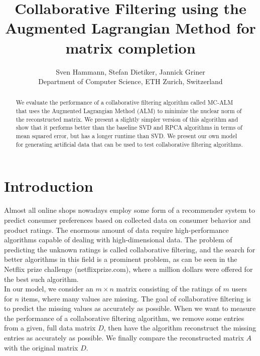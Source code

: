 \documentclass[10pt,conference,compsocconf]{IEEEtran}
\begin{document}
\title{Collaborative Filtering using the Augmented Lagrangian Method for matrix completion}

\author{
  Sven Hammann, Stefan Dietiker, Jannick Griner\\
  Department of Computer Science, ETH Zurich, Switzerland
}



\maketitle

\begin{abstract}
We evaluate the performance of a collaborative filtering algorithm called MC-ALM that uses the
Augmented Lagrangian Method (ALM) to minimize the nuclear norm of the reconstructed matrix.
We present a slightly simpler version of this algorithm and show that it performs better than the baseline
SVD and RPCA algorithms in terms of mean squared error, but has a longer runtime than SVD. We present our own 
model for generating artificial data that can be used to test collaborative filtering algorithms.
\end{abstract}

\section{Introduction}
Almost all online shops nowadays employ some form of a recommender system to predict consumer preferences based on collected data on consumer behavior and product ratings. The enormous amount of data require high-performance algorithms capable of dealing with high-dimensional data. The problem of predicting the unknown ratings is called collaborative filtering, and the search for better algorithms in this field is a prominent problem, as can be seen in the Netflix prize challenge (netflixprize.com), where a million dollars were offered for the best such algorithm. \\

In our model, we consider an $m \times n$ matrix consisting of the ratings of $m$ users for $n$ items,
where many values are missing. The goal of collaborative filtering is to predict the missing values as accurately as possible. 
When we want to measure the performance of a collaborative filtering algorithm, we remove some entries from a given, full data matrix $D$, then have the algorithm reconstruct the missing entries as accurately as possible. We finally compare the reconstructed matrix $A$ with the original matrix $D$. \\
\end{document}
